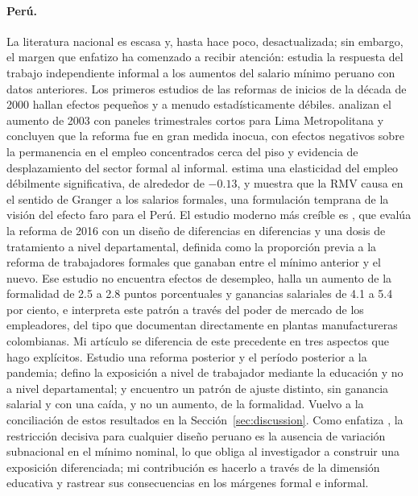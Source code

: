 \paragraph{Perú.} La literatura nacional es escasa y, hasta hace poco, desactualizada; sin embargo, el margen que enfatizo ha comenzado a recibir atención: \citet{corcuera_2024} estudia la respuesta del trabajo independiente informal a los aumentos del salario mínimo peruano con datos anteriores. Los primeros estudios de las reformas de inicios de la década de 2000 hallan efectos pequeños y a menudo estadísticamente débiles. \citet{jaramillo_lopez_2006} analizan el aumento de 2003 con paneles trimestrales cortos para Lima Metropolitana y concluyen que la reforma fue en gran medida inocua, con efectos negativos sobre la permanencia en el empleo concentrados cerca del piso y evidencia de desplazamiento del sector formal al informal. \citet{cespedes_2005} estima una elasticidad del empleo débilmente significativa, de alrededor de $-0.13$, y muestra que la RMV causa en el sentido de Granger a los salarios formales, una formulación temprana de la visión del efecto faro para el Perú. El estudio moderno más creíble es \citet{jimenez_2023}, que evalúa la reforma de 2016 con un diseño de diferencias en diferencias y una dosis de tratamiento a nivel departamental, definida como la proporción previa a la reforma de trabajadores formales que ganaban entre el mínimo anterior y el nuevo. Ese estudio no encuentra efectos de desempleo, halla un aumento de la formalidad de 2.5 a 2.8 puntos porcentuales y ganancias salariales de 4.1 a 5.4 por ciento, e interpreta este patrón a través del poder de mercado de los empleadores, del tipo que \citet{amodio_deroux_2021} documentan directamente en plantas manufactureras colombianas. Mi artículo se diferencia de este precedente en tres aspectos que hago explícitos. Estudio una reforma posterior y el período posterior a la pandemia; defino la exposición a nivel de trabajador mediante la educación y no a nivel departamental; y encuentro un patrón de ajuste distinto, sin ganancia salarial y con una caída, y no un aumento, de la formalidad. Vuelvo a la conciliación de estos resultados en la Sección~\ref{sec:discussion}. Como enfatiza \citet{jimenez_2023}, la restricción decisiva para cualquier diseño peruano es la ausencia de variación subnacional en el mínimo nominal, lo que obliga al investigador a construir una exposición diferenciada; mi contribución es hacerlo a través de la dimensión educativa y rastrear sus consecuencias en los márgenes formal e informal.

